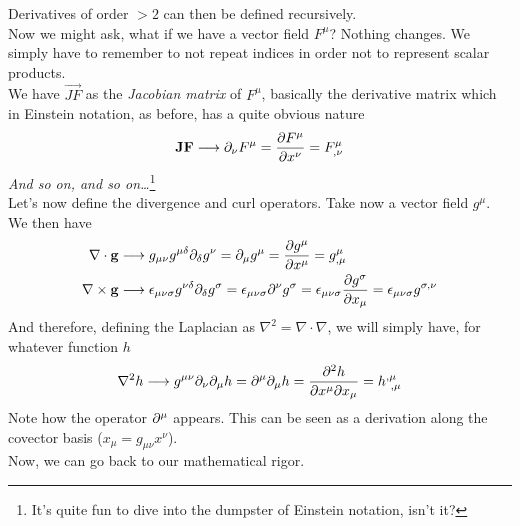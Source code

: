 \documentclass[../complete.tex]{subfiles}
\begin{document}
Derivatives of order $>2$ can then be defined recursively.\\
Now we might ask, what if we have a vector field $F^\mu$? Nothing changes. We simply have to remember to not repeat indices in order not to represent scalar products.\\
We have $\vec{JF}$ as the \textit{Jacobian matrix} of $F^\mu$, basically the derivative matrix which in Einstein notation, as before, has a quite obvious nature
\begin{equation}
	\mathbf{JF}\overset{}{\longrightarrow}\partial_\nu F^\mu=\pdv{F^\mu}{x^\nu}=F^\mu_{,\nu}
	\label{eq:jacobianenot}
\end{equation}
\textit{And so on, and so on\ldots}\footnote{It's quite fun to dive into the dumpster of Einstein notation, isn't it?}\\
Let's now define the divergence and curl operators. Take now a vector field $g^\mu$. We then have
\begin{equation}
	\begin{aligned}
		\nabla\cdot\mathbf{g}&\overset{}{\longrightarrow} g_{\mu\nu}g^{\mu\delta}\partial_\delta g^\nu=\partial_\mu g^\mu=\pdv{g^\mu}{x^\mu}=g^{\mu}_{,\mu}\\
		\nabla\times\mathbf{g}&\overset{}{\longrightarrow} \epsilon_{\mu\nu\sigma}g^{\nu\delta}\partial_\delta g^\sigma=\epsilon_{\mu\nu\sigma}\partial^\nu g^\sigma=\epsilon_{\mu\nu\sigma}\pdv{g^\sigma}{x_\mu}=\epsilon_{\mu\nu\sigma}g^{\sigma,\nu}
	\end{aligned}
	\label{eq:divroten}
\end{equation}
And therefore, defining the Laplacian as $\nabla^2=\nabla\cdot\nabla$, we will simply have, for whatever function $h$
\begin{equation}
	\nabla^2 h\overset{}{\longrightarrow} g^{\mu\nu}\partial_\nu\partial_\mu h=\partial^\mu\partial_\mu h=\pdv[2]{h}{x^\mu}{x_\mu}=h^{,\mu}_{\ ,\mu}
	\label{eq:laplacianen}
\end{equation}
Note how the operator $\partial^\mu$ appears. This can be seen as a derivation along the covector basis ($x_\mu=g_{\mu\nu}x^\nu$).\\
Now, we can go back to our mathematical rigor.\newpage
\end{document}
